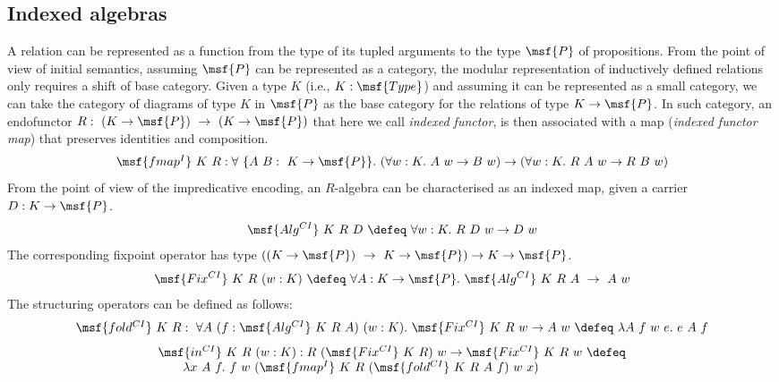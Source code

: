 \documentclass[submission,copyright,creativecommons]{eptcs}
\newcounter{prop}
\begin{document}
\subsection{Indexed algebras}



A relation can be represented as a function from the type of its
tupled arguments to the type $\msf{P}$ of propositions. From the point
of view of initial semantics, assuming $\msf{P}$ can be represented as
a category, the modular representation of inductively defined
relations only requires a shift of base category. Given a type $K$
(i.e., $K: \msf{Type}$) and assuming it can be represented as a small
category, we can take the category of diagrams of type $K$ in
$\msf{P}$ as the base category for the relations of type $K \to
\msf{P}$. In such category, an endofunctor 
$R: \ (K \to \msf{P}) \ \to \ (K \to \msf{P})$
that here we call \emph{indexed functor}, is then associated with a
map (\emph{indexed functor map}) that preserves identities and
composition.
\begin{gather}
\begin{array}{lll}
\msf{fmap^I} \ K \ R : \forall \ \{ A \ B : \ K \to \msf{P} \}. 
\ (\forall w:K. \ A \ w \to B \ w) \to (\forall w:K. \ R \ A \ w \to R
\ B \ w)
\end{array}
\end{gather}
From the point of view of the impredicative encoding, 
an $R$-algebra can be characterised as an indexed map, given a carrier
$D: K \to \msf{P}$.
\begin{gather}
\msf{Alg^{CI}} \ K \ R \ D \ \defeq \ \forall w:K. \ R \ D \ w \to D \ w
\end{gather}
The corresponding fixpoint operator has type $ ((K \to \msf{P}) \ \to
\ K \to \msf{P}) \to K \to \msf{P} $.
\begin{gather} \msf{Fix^{CI}} \ K \ R \ (w:K) \ 
\defeq \ \forall A: K \to \msf{P}. \ \msf{Alg^{CI}} \ K \ R \ A
\ \to \ A \ w
\end{gather}
The structuring operators can be defined as follows:
\begin{gather} 
\begin{array}{lll}
\msf{fold^{CI}} \ K \ R : \ \forall A \ (f: \msf{Alg^{CI}} \ K \ R \ A)
\ (w: K). \ \msf{Fix^{CI}} \ K \ R \ w \to A \ w \ \defeq 
\ \lambda A \ f \ w \ e. \ e \ A \ f
\end{array}
\end{gather}
\begin{gather} 
\begin{array}{lll}
\msf{in^{CI}} \ K \ R \ (w: K) : R \ (\msf{Fix^{CI}} \ K \ R) \ w \to
\msf{Fix^{CI}} \ K \ R \ w \ \defeq \\ 
 \qquad 
\lambda x \ A \ f. \ f \ w \ (\msf{fmap^I} \ K \ R 
\ (\msf{fold^{CI}} \ K \ R \ A \ f) \ w \ x)
\end{array}
\end{gather}
\end{document}

